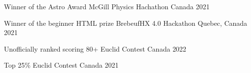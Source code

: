 



\begin{cvhonors}

  \cvhonor
    {Winner of the Astro Award} %
    {McGill Physics Hachathon} %
    {Canada} %
    {2021} %

  \cvhonor
    {Winner of the beginner HTML prize} %
    {BrebeufHX 4.0 Hackathon} %
    {Quebec, Canada} %
    {2021} %






  \cvhonor
    {Unofficially ranked scoring 80+} %
    {Euclid Contest} %
    {Canada} %
    {2022} %
    
  \cvhonor
    {Top 25\%} %
    {Euclid Contest} %
    {Canada} %
    {2021} %
    




\end{cvhonors}
